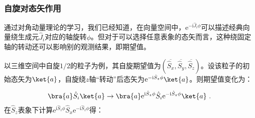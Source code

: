 


\subsubsection{自旋对态矢作用}
 通过对角动量理论的学习，我们已经知道，在向量空间中，$\mathrm e^{-\mathrm i\hat J_i\phi}$可以描述经典向量绕生成元$\hat J_i$对应的轴旋转$\phi$。但对于可以选择任意表象的态矢而言，这种绕固定轴的转动还可以影响别的观测结果，即期望值。

以三维空间中自旋$1/2$的粒子为例，其自旋期望值为$(\overline{\hat S_x},\overline{\hat S_y},\overline{\hat S_z})$。设该粒子的初始态矢为$\ket{a}$，自旋绕$z$轴“转动”后态矢为$\mathrm e^{-\mathrm i \hat S_z\phi}\ket{a}$。则期望值变化为：

\begin{equation}
\bra{a}\hat S_i\ket{a}\rightarrow \bra{a}\mathrm e^{\mathrm i \hat S_z\phi}\hat S_i\mathrm e^{-\mathrm i \hat S_z\phi}\ket{a}~.
\end{equation}
在$\hat S_z$表象下计算$\mathrm e^{\mathrm i \hat S_z\phi}\hat S_x\mathrm e^{-\mathrm i \hat S_z\phi}$得：


